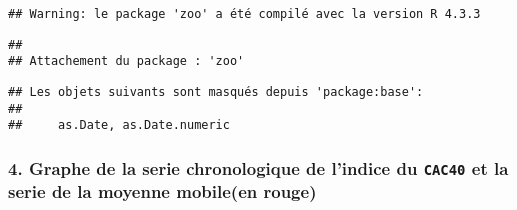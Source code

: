 \documentclass[
]{article}
\newenvironment{Shaded}{\begin{snugshade}}{\end{snugshade}}
\newcommand{\AttributeTok}[1]{\textcolor[rgb]{0.13,0.29,0.53}{#1}}
\newcommand{\CommentTok}[1]{\textcolor[rgb]{0.56,0.35,0.01}{\textit{#1}}}
\newcommand{\ConstantTok}[1]{\textcolor[rgb]{0.56,0.35,0.01}{#1}}
\newcommand{\DecValTok}[1]{\textcolor[rgb]{0.00,0.00,0.81}{#1}}
\newcommand{\FunctionTok}[1]{\textcolor[rgb]{0.13,0.29,0.53}{\textbf{#1}}}
\newcommand{\NormalTok}[1]{#1}
\newcommand{\OtherTok}[1]{\textcolor[rgb]{0.56,0.35,0.01}{#1}}
\newcommand{\SpecialCharTok}[1]{\textcolor[rgb]{0.81,0.36,0.00}{\textbf{#1}}}
\newcommand{\StringTok}[1]{\textcolor[rgb]{0.31,0.60,0.02}{#1}}
\begin{document}
\begin{verbatim}
## Warning: le package 'zoo' a été compilé avec la version R 4.3.3
\end{verbatim}

\begin{verbatim}
## 
## Attachement du package : 'zoo'
\end{verbatim}

\begin{verbatim}
## Les objets suivants sont masqués depuis 'package:base':
## 
##     as.Date, as.Date.numeric
\end{verbatim}

\begin{Shaded}
\end{Shaded}

\begin{Shaded}
\end{Shaded}

\subsubsection{\texorpdfstring{4. Graphe de la serie chronologique de
l'indice du \texttt{CAC40} et la serie de la moyenne mobile(en
rouge)}{4. Graphe de la serie chronologique de l'indice du CAC40 et la serie de la moyenne mobile(en rouge)}}\label{graphe-de-la-serie-chronologique-de-lindice-du-cac40-et-la-serie-de-la-moyenne-mobileen-rouge}
\end{document}
